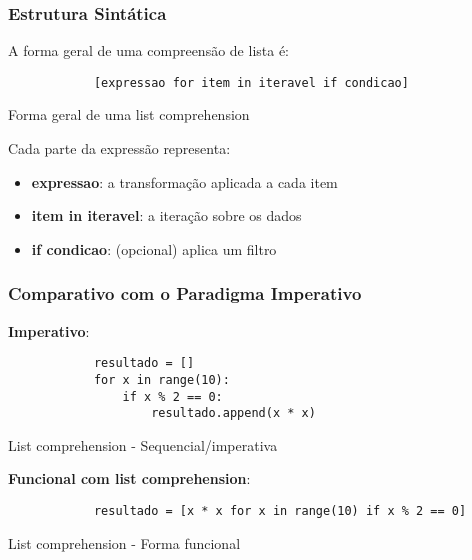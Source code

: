 \documentclass[date,twocolumn,a4paper]{ppgem}
\begin{document}
    \subsubsection{Estrutura Sintática}
    A forma geral de uma compreensão de lista é:

    \begin{listing}[!ht]
        \begin{verbatim}
            [expressao for item in iteravel if condicao]
        \end{verbatim}
        \caption{Forma geral de uma list comprehension}
        \label{listing:2}
    \end{listing}

    Cada parte da expressão representa:
    \begin{itemize}
        \item \textbf{expressao}: a transformação aplicada a cada item
        \item \textbf{item in iteravel}: a iteração sobre os dados
        \item \textbf{if condicao}: (opcional) aplica um filtro
    \end{itemize}

    \subsubsection{Comparativo com o Paradigma Imperativo}
    \textbf{Imperativo}:

    \begin{listing}[!ht]
        \begin{verbatim}
            resultado = []
            for x in range(10):
                if x % 2 == 0:
                    resultado.append(x * x)
        \end{verbatim}
        \caption{List comprehension - Sequencial/imperativa}
        \label{listing:2}
    \end{listing}
    \textbf{Funcional com list comprehension}:
    \begin{listing}[!ht]
        \begin{verbatim}
            resultado = [x * x for x in range(10) if x % 2 == 0]
        \end{verbatim}
        \caption{List comprehension - Forma funcional}
        \label{listing:2}
    \end{listing}
\end{document}
